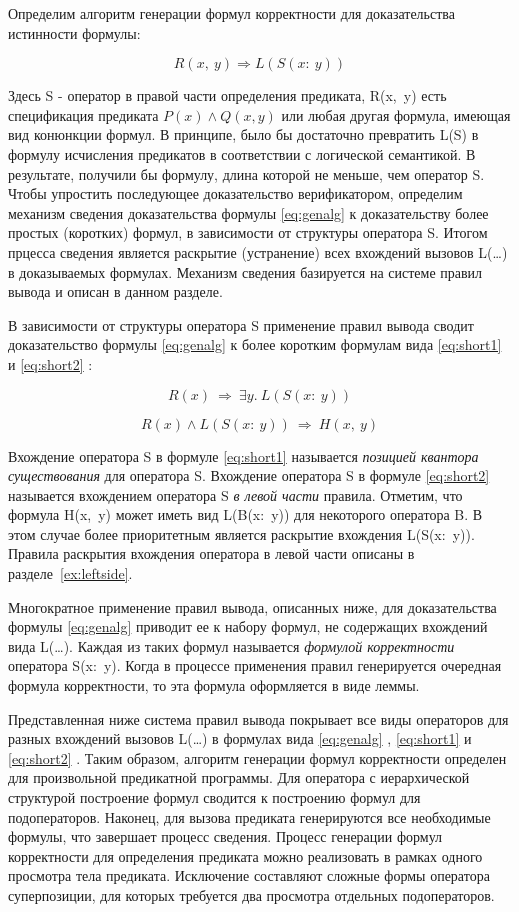 \documentclass[10pt,a4paper]{article}
\newcommand{\numformula}[2] {
\begin{equation}
\label{eq:#1}
#2
\end{equation}
}
\newcommand{\lnkformula}[1] {
\eqref{eq:#1}
}
\begin{document}
Определим алгоритм генерации формул корректности для доказательства истинности формулы:

\numformula{genalg} {
R(x,~y) \Rightarrow L(S(x:~y))
}

Здесь S - оператор в правой части определения предиката, R(x, y) есть спецификация предиката $ P(x) \land Q(x, y) $ или любая другая формула, имеющая вид конюнкции формул. В принципе, было бы достаточно превратить L(S) в формулу исчисления предикатов в соответствии с логической семантикой. В результате, получили бы формулу, длина которой не меньше, чем оператор S. Чтобы упростить последующее доказательство верификатором, определим механизм сведения доказательства формулы \lnkformula{genalg} к доказательству более простых (коротких) формул, в зависимости от структуры оператора S. Итогом прцесса сведения является раскрытие (устранение) всех вхождений вызовов L(…) в доказываемых формулах. Механизм сведения базируется на системе правил вывода и описан в данном разделе.

В зависимости от структуры оператора S применение правил вывода сводит доказательство формулы \lnkformula{genalg} к более коротким формулам вида \lnkformula{short1} и \lnkformula{short2}:

\begin{center}
\numformula{short1} {R(x)~\Rightarrow~\exists y.~L(S(x:~y))}
\numformula{short2} {R(x) \land L(S(x:~y))~\Rightarrow~H(x,~y)}
\end{center}

Вхождение оператора S в формуле \lnkformula{short1} называется \textit{позицией квантора существования} для оператора S. Вхождение оператора S в формуле \lnkformula{short2} называется вхождением оператора S \textit{в левой части} правила. Отметим, что формула H(x, y) может иметь вид L(B(x: y)) для некоторого оператора B. В этом случае более приоритетным является раскрытие вхождения L(S(x: y)). Правила раскрытия вхождения оператора в левой части описаны в разделе~\ref{ex:leftside}.

Многократное применение правил вывода, описанных ниже, для доказательства формулы \lnkformula{genalg} приводит ее к набору формул, не содержащих вхождений вида L(…). Каждая из таких формул называется \textit{формулой корректности} оператора S(x: y). Когда в процессе применения правил генерируется очередная формула корректности, то эта формула оформляется в виде леммы.

Представленная ниже система правил вывода покрывает все виды операторов для разных вхождений вызовов L(…) в формулах вида \lnkformula{genalg}, \lnkformula{short1} и \lnkformula{short2}. Таким образом, алгоритм генерации формул корректности определен для произвольной предикатной программы. Для оператора с иерархической структурой построение формул сводится к построению формул для подоператоров. Наконец, для вызова предиката генерируются все необходимые формулы, что завершает процесс сведения. Процесс генерации формул корректности для определения предиката можно реализовать в рамках одного просмотра тела предиката. Исключение составляют сложные формы оператора суперпозиции, для которых требуется два просмотра отдельных подоператоров.
\end{document}
